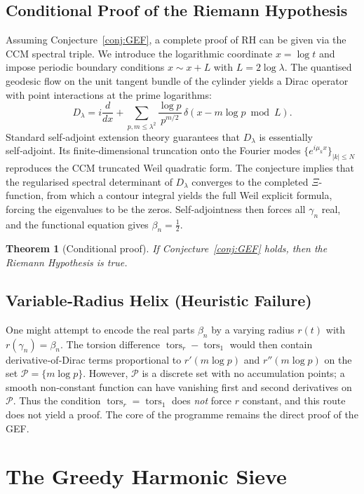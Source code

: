 \documentclass[12pt,a4paper,twoside]{book}
\newtheorem{theorem}{Theorem}[chapter]
\newcommand{\tors}{\operatorname{tors}}
\begin{document}
\section{Conditional Proof of the Riemann Hypothesis}

Assuming Conjecture~\ref{conj:GEF}, a complete proof of RH can be given via the CCM spectral triple.  We introduce the logarithmic coordinate \(x = \log t\) and impose periodic boundary conditions \(x\sim x+L\) with \(L=2\log\lambda\).  The quantised geodesic flow on the unit tangent bundle of the cylinder yields a Dirac operator with point interactions at the prime logarithms:
\[
D_\lambda = i\frac{d}{dx} + \sum_{p,m\le\lambda^2} \frac{\log p}{p^{m/2}} \,\delta(x - m\log p \bmod L).
\]
Standard self‑adjoint extension theory guarantees that \(D_\lambda\) is essentially self‑adjoint.  Its finite‑dimensional truncation onto the Fourier modes \(\{e^{i\mu_k x}\}_{|k|\le N}\) reproduces the CCM truncated Weil quadratic form.  The conjecture implies that the regularised spectral determinant of \(D_\lambda\) converges to the completed \(\Xi\)-function, from which a contour integral yields the full Weil explicit formula, forcing the eigenvalues to be the zeros.  Self‑adjointness then forces all \(\gamma_n\) real, and the functional equation gives \(\beta_n = \frac12\).

\begin{theorem}[Conditional proof]
If Conjecture~\ref{conj:GEF} holds, then the Riemann Hypothesis is true.
\end{theorem}

\section{Variable‑Radius Helix (Heuristic Failure)}
One might attempt to encode the real parts \(\beta_n\) by a varying radius \(r(t)\) with \(r(\gamma_n)=\beta_n\).  The torsion difference \(\tors_r - \tors_1\) would then contain derivative‑of‑Dirac terms proportional to \(r'(m\log p)\) and \(r''(m\log p)\) on the set \(\mathcal{P}=\{m\log p\}\).  However, \(\mathcal{P}\) is a discrete set with no accumulation points; a smooth non‑constant function can have vanishing first and second derivatives on \(\mathcal{P}\).  Thus the condition \(\tors_r = \tors_1\) does \emph{not} force \(r\) constant, and this route does not yield a proof.  The core of the programme remains the direct proof of the GEF.

\chapter{The Greedy Harmonic Sieve}
\end{document}
